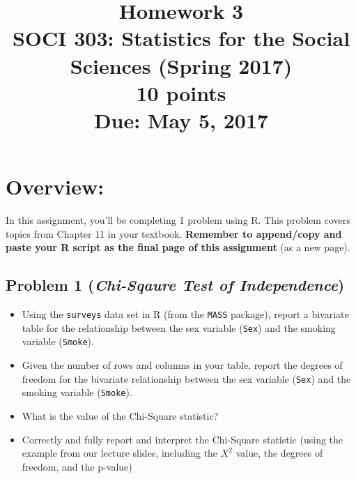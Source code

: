 \documentclass{article}
\begin{document}
\title{Homework 3\\ SOCI 303: Statistics for the Social Sciences (Spring 2017) \\ {\large{10 points}} \\ {\large{Due: May 5, 2017}}}
\author[*]{}
\date{}
\maketitle



\section*{Overview:}
In this assignment, you'll be completing 1 problem using R. This problem covers topics from Chapter 11 in your textbook. \textbf{Remember to append/copy and paste your R script as the final page of this assignment} (as a new page).

\subsection*{Problem 1 (\textit{Chi-Sqaure Test of Independence})}
\begin{itemize}
\item Using the \texttt{surveys} data set in R (from the \texttt{MASS} package), report a bivariate table for the relationship between the sex variable (\texttt{Sex}) and the smoking variable (\texttt{Smoke}).
\item Given the number of rows and columns in your table, report the degrees of freedom for the bivariate relationship between the sex variable (\texttt{Sex}) and the smoking variable (\texttt{Smoke}). 
\item What is the value of the Chi-Square statistic? 
\item Correctly and fully report and interpret the Chi-Square statistic (using the example from our lecture slides, including the $X^2$ value, the degrees of freedom, and the p-value) 
\end{itemize}
\end{document}
